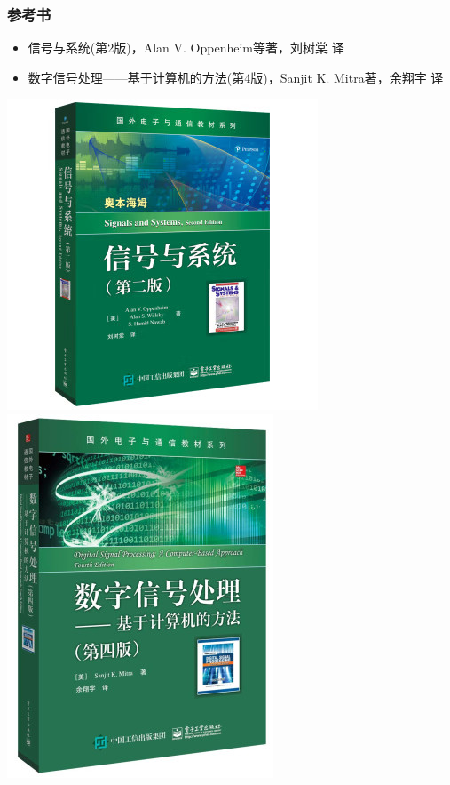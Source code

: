 \documentclass[CJKutf8,dvipsnames,table]{beamer}
\begin{document}
\begin{CJK*}{UTF8}{song}
  \begin{frame}
    \frametitle{参考书}
    \begin{itemize}
    \item 信号与系统(第2版)，Alan V. Oppenheim等著，刘树棠 译
    \item 数字信号处理——基于计算机的方法(第4版)，Sanjit K. Mitra著，余翔宇 译
    \end{itemize}
    \begin{center}
      \includegraphics[scale=.31]{signalsandsystems}
      \hspace{1mm}
      \includegraphics[scale=.35]{mitradsp}
    \end{center}
  \end{frame}
  

\end{CJK*}
\end{document}
